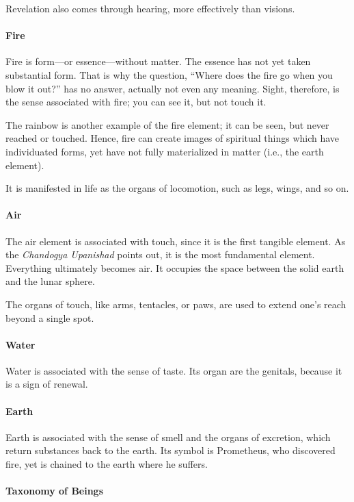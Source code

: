 Revelation also comes through hearing, more effectively than visions.

\paragraph{Fire}


Fire is form---or essence---without matter. The essence has not yet taken substantial form. That is why the question, ``Where does the fire go when you blow it out?'' has no answer, actually not even any meaning. Sight, therefore, is the sense associated with fire; you can see it, but not touch it.

The rainbow is another example of the fire element; it can be seen, but never reached or touched. Hence, fire can create images of spiritual things which have individuated forms, yet have not fully materialized in matter (i.e., the earth element).

It is manifested in life as the organs of locomotion, such as legs, wings, and so on.

\paragraph{Air}


The air element is associated with touch, since it is the first tangible element. As the \emph{Chandogya Upanishad} points out, it is the most fundamental element. Everything ultimately becomes air. It occupies the space between the solid earth and the lunar sphere.

The organs of touch, like arms, tentacles, or paws, are used to extend one's reach beyond a single spot.

\paragraph{Water}


Water is associated with the sense of taste. Its organ are the genitals, because it is a sign of renewal.

\paragraph{Earth}


Earth is associated with the sense of smell and the organs of excretion, which return substances back to the earth. Its symbol is Prometheus, who discovered fire, yet is chained to the earth where he suffers.

\paragraph{Taxonomy of Beings}





